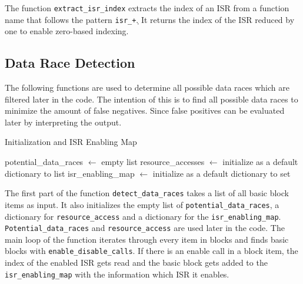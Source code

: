 \documentclass[
fancyheadings, %
%
%
]{stsreprt}
\begin{document}
{		The function \texttt{extract\_isr\_index} extracts the index of an ISR from a function name that follows the pattern \texttt{isr\_\d+}. It returns the index of the ISR reduced by one to enable zero-based indexing.
		
		\subsection*{Data Race Detection}
		The following functions are used to determine all possible data races which are filtered later in the code. The intention of this is to find all possible data races to minimize the amount of false negatives. Since false positives can be evaluated later by interpreting the output.
		
		\begin{algorithm}[H]
			\caption{Initialization and ISR Enabling Map}
			\DontPrintSemicolon
			\SetAlgoLined
			\BlankLine
			potential\_data\_races $\gets$ empty list\;
			resource\_accesses $\gets$ initialize as a default dictionary to list\;
			isr\_enabling\_map $\gets$ initialize as a default dictionary to set\;
			\BlankLine
		\end{algorithm}
		
		
		The first part of the function \texttt{detect\_data\_races} takes a list of all basic block items as input. It also initializes the empty list of \texttt{potential\_data\_races}, a dictionary for \texttt{resource\_access} and a dictionary for the \texttt{isr\_enabling\_map}. \texttt{Potential\_data\_races} and \texttt{resource\_access} are used later in the code. The main loop of the function iterates through every item in blocks and finds basic blocks with \texttt{enable\_disable\_calls}. If there is an enable call in a block item, the index of the enabled ISR gets read and the basic block gets added to the \texttt{isr\_enabling\_map} with the information which ISR it enables.
		
}
\end{document}
